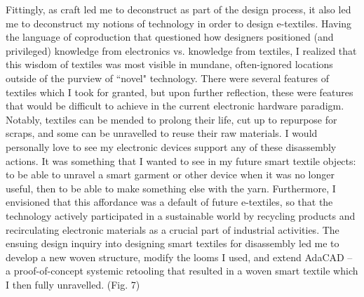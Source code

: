 Fittingly, as craft led me to deconstruct as part of the design process, it also led me to deconstruct my notions of technology in order to design e-textiles.
Having the language of coproduction that questioned how designers positioned (and privileged) knowledge from electronics vs. knowledge from textiles, I realized that this wisdom of textiles was most visible in mundane, often-ignored locations outside of the purview of ``novel" technology. There were several features of textiles which I took for granted, but upon further reflection, these were features that would be difficult to achieve in the current electronic hardware paradigm. 
Notably, textiles can be mended to prolong their life, cut up to repurpose for scraps, and some can be unravelled to reuse their raw materials. I would personally love to see my electronic devices support any of these disassembly actions. It was something that I wanted to see in my future smart textile objects: to be able to unravel a smart garment or other device when it was no longer useful, then to be able to make something else with the yarn. Furthermore, I envisioned that this affordance was a default of future e-textiles, so that the technology actively participated in a sustainable world by recycling products and recirculating electronic materials as a crucial part of industrial activities. The ensuing design inquiry into designing smart textiles for disassembly led me to develop a new woven structure, modify the looms I used, and extend AdaCAD -- a proof-of-concept systemic retooling that resulted in a woven smart textile which I then fully unravelled. (Fig. 7)



